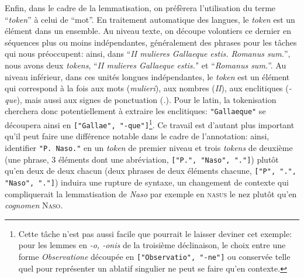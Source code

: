 Enfin, dans le cadre de la lemmatisation, on préfèrera l'utilisation du terme \enquote{\textit{token}} à celui de \enquote{mot}. En traitement automatique des langues, le \textit{token} est un élément dans un ensemble. Au niveau texte, on découpe volontiers ce dernier en séquences plus ou moins indépendantes, généralement des phrases pour les tâches qui nous préoccupent: ainsi, dans ``\textit{II mulieres Gallaeque estis. Romanus sum.}'', nous avons deux \textit{tokens}, ``\textit{II mulieres Gallaeque estis.'}' et ``\textit{Romanus sum.}''. Au niveau inférieur, dans ces unités longues indépendantes, le \textit{token} est un élément qui correspond à la fois aux mots (\textit{mulieri}), aux nombres (\textit{II}), aux enclitiques (\textit{-que}), mais aussi aux signes de ponctuation (\textit{.}). Pour le latin, la tokenisation cherchera donc potentiellement à extraire les enclitiques: \texttt{"Gallaeque"} se découpera ainsi en \texttt{["Gallae", "-que"]}\footnote{Cette tâche n'est pas aussi facile que pourrait le laisser deviner cet exemple: pour les lemmes en \textit{-o, -onis} de la troisième déclinaison, le choix entre une forme \textit{Observatione} découpée en \texttt{["Observatio", "-ne"]} ou conservée telle quel pour représenter un ablatif singulier ne peut se faire qu'en contexte.}. Ce travail est d'autant plus important qu'il peut faire une différence notable dans le cadre de l'annotation: ainsi, identifier \texttt{"P. Naso."} en un \textit{token} de premier niveau et trois \textit{tokens} de deuxième (une phrase, 3 éléments dont une abréviation, \texttt{["P.", "Naso", "."]}) plutôt qu'en deux de deux chacun (deux phrases de deux éléments chacune, \texttt{["P", ".", "Naso", "."]}) induira une rupture de syntaxe, un changement de contexte qui compliquerait la lemmatisation de \textit{Naso} par exemple en \textsc{nasus} le nez plutôt qu'en \textit{cognomen} \textsc{Naso}.


